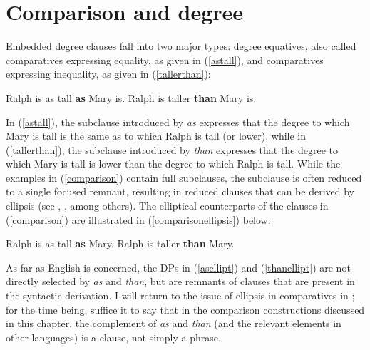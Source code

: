 \section{Comparison and degree} \label{sec:5comparison}
Embedded degree clauses fall into two major types: degree equatives, also called comparatives expressing equality, as given in (\ref{astall}), and comparatives expressing inequality, as given in (\ref{tallerthan}):

\ea \label{comparison}
\ea Ralph is as tall \textbf{as} Mary is.\label{astall}
\ex Ralph is taller \textbf{than} Mary is.\label{tallerthan}
\z
\z

In (\ref{astall}), the subclause introduced by \textit{as} expresses that the degree to which Mary is tall is the same as to which Ralph is tall (or lower), while in (\ref{tallerthan}), the subclause introduced by \textit{than} expresses that the degree to which Mary is tall is lower than the degree to which Ralph is tall. While the examples in (\ref{comparison}) contain full subclauses, the subclause is often reduced to a single focused remnant, resulting in reduced clauses that can be derived by ellipsis (see \citealt{merchant2009}, \citealt{bhatttakahashi2011}, \citealt{bacskaiatkari2014alh, bacskaiatkari2014diss} among others). The elliptical counterparts of the clauses in (\ref{comparison}) are illustrated in (\ref{comparisonellipsis}) below:

\ea \label{comparisonellipsis}
\ea Ralph is as tall \textbf{as} Mary.\label{asellipt}
\ex Ralph is taller \textbf{than} Mary.\label{thanellipt}
\z
\z

As far as English is concerned, the DPs in (\ref{asellipt}) and (\ref{thanellipt}) are not directly selected by \textit{as} and \textit{than}, but are remnants of clauses that are present in the syntactic derivation. I will return to the issue of ellipsis in comparatives in ; for the time being, suffice it to say that in the comparison constructions discussed in this chapter, the complement of \textit{as} and \textit{than} (and the relevant elements in other languages) is a clause, not simply a phrase.

